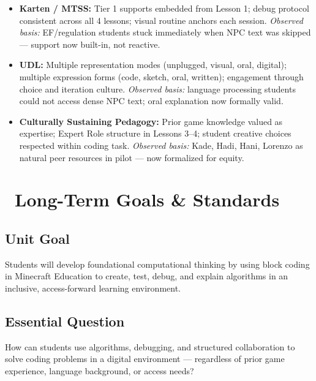 \documentclass[12pt]{article}
\begin{document}
\begin{designbox}
\begin{itemize}
\item \textbf{Karten / MTSS:} Tier 1 supports embedded from Lesson 1; debug protocol consistent across all 4 lessons; visual routine anchors each session. \textit{Observed basis:} EF/regulation students stuck immediately when NPC text was skipped --- support now built-in, not reactive.
\item \textbf{UDL:} Multiple representation modes (unplugged, visual, oral, digital); multiple expression forms (code, sketch, oral, written); engagement through choice and iteration culture. \textit{Observed basis:} language processing students could not access dense NPC text; oral explanation now formally valid.
\item \textbf{Culturally Sustaining Pedagogy:} Prior game knowledge valued as expertise; Expert Role structure in Lessons 3--4; student creative choices respected within coding task. \textit{Observed basis:} Kade, Hadi, Hani, Lorenzo as natural peer resources in pilot --- now formalized for equity.
\end{itemize}
\end{designbox}

\section{\texorpdfstring{\faBullseye\ Long-Term Goals \& Standards}{Long-Term Goals and Standards}}

\subsection{Unit Goal}

Students will develop foundational computational thinking by using block coding in Minecraft Education to create, test, debug, and explain algorithms in an inclusive, access-forward learning environment.

\subsection{Essential Question}

How can students use algorithms, debugging, and structured collaboration to solve coding problems in a digital environment --- regardless of prior game experience, language background, or access needs?
\end{document}
